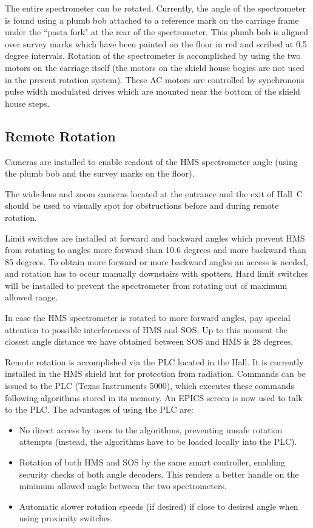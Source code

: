 The entire spectrometer can be rotated. Currently, the angle of the spectrometer
is found using a plumb bob attached to a reference mark on the
carriage frame under the ``pasta fork" at the rear of the spectrometer.
This plumb bob is aligned over survey marks which have been painted
on the floor in red and scribed at 0.5 degree intervals. Rotation of the spectrometer
is accomplished by using the two motors on the carriage itself (the motors on
the shield house bogies are not used in the present rotation system).
These AC motors are controlled by synchronous pulse width modulated
drives which are mounted near the bottom of the shield house steps.

\subsection{Remote Rotation}

Cameras are installed to enable readout of the HMS spectrometer angle
(using the plumb bob and the survey marks on the floor).

The wide-lens and zoom cameras located at the entrance and
the exit of Hall~C should be used to visually spot for obstructions
before and during remote rotation.

Limit switches are installed at forward
and backward angles which prevent HMS from rotating to angles more forward than
10.6 degrees and more backward than 85 degrees. To obtain more forward or more
backward angles an access is needed, and rotation has to occur manually
downstairs with spotters. Hard limit switches will be installed to prevent
the spectrometer from rotating out of maximum allowed range.

In case the HMS spectrometer is rotated to more forward angles, pay special
attention to possible interferences of HMS and SOS. Up to this moment
the closest  angle distance we have obtained between SOS and HMS is 28 degrees.

Remote rotation  is accomplished via the PLC located in the Hall.  It
is currently installed in the HMS shield hut for protection from
radiation.  Commands can be issued to the PLC (Texas Instruments 5000), which executes these commands
following algorithms stored in its memory. An EPICS screen is now
used to talk to the PLC.  The advantages of using the PLC are:

\begin{itemize}
\item{No direct access by users to the algorithms, preventing unsafe
rotation attempts (instead, the algorithms have to be loaded locally into
the PLC).}
\item{Rotation of both HMS and SOS by the same smart controller, enabling
security checks of both angle decoders. This renders a better handle on the
minimum allowed angle between the two spectrometers.}
\item{Automatic slower rotation speeds (if desired) if close to desired angle
when using proximity switches.}
\end{itemize}

